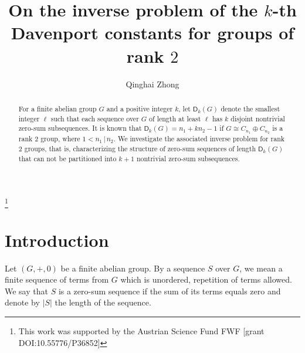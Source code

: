 \documentclass[11pt]{amsart}
\theoremstyle{definition}
\renewcommand{\t}{\, | \,}
\numberwithin{equation}{section}
\begin{document}
\title{On the inverse  problem of the $k$-th Davenport constants for groups of rank  $2$}

\author{Qinghai Zhong}

\address{University of Graz, NAWI Graz,
	Department of Mathematics and Scientific Computing \\
	Heinrichstra{\ss}e 36\\
	8010 Graz, Austria}



\thanks{This work was supported by the Austrian Science Fund FWF [grant DOI:10.55776/P36852]}





\begin{abstract}
 For a finite abelian group $G$ and a positive integer $k$, let $\mathsf{D}_k(G)$ denote the smallest integer $\ell$ such that each sequence over $G$ of length at least $\ell$ has $k$ disjoint nontrivial zero-sum subsequences. It is known that $\mathsf D_k(G)=n_1+kn_2-1$ if $G\cong C_{n_1}\oplus C_{n_2}$ is a rank $2$ group, where $1<n_1\t n_2$. We investigate the associated inverse problem for rank $2$ groups, that is,  characterizing the structure of  zero-sum sequences of length $\mathsf D_k(G)$ that can not be partitioned into $k+1$ nontrivial zero-sum subsequences.
\end{abstract}

\maketitle


\section{Introduction}




Let $(G, +, 0)$ be a finite abelian group. By a sequence $S$
over $G$, we mean a finite sequence of terms from $G$ which is unordered, repetition of terms allowed. We say that $S$ is a zero-sum sequence if the sum of its terms equals zero and denote by $|S|$ the length of the sequence.
\end{document}
